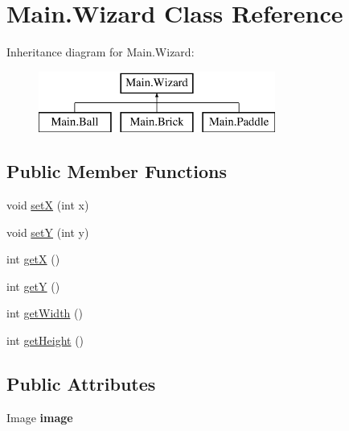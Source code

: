 \hypertarget{class_main_1_1_wizard}{}\section{Main.\+Wizard Class Reference}
\label{class_main_1_1_wizard}
Inheritance diagram for Main.\+Wizard\+:\begin{figure}[H]
\begin{center}
\leavevmode
\includegraphics[height=2.000000cm]{class_main_1_1_wizard}
\end{center}
\end{figure}
\subsection*{Public Member Functions}
\begin{DoxyCompactItemize}
\item 
void \hyperlink{class_main_1_1_wizard_aa4b5c7faf39649ed8fb1fb33cc3788e6}{setX} (int x)
\item 
void \hyperlink{class_main_1_1_wizard_a4c5d8c80ab66a0d2fa140ac5052f2d02}{setY} (int y)
\item 
int \hyperlink{class_main_1_1_wizard_af96f444dd5a2c9c62dfd8fdcbfd879f0}{getX} ()
\item 
int \hyperlink{class_main_1_1_wizard_a718fbfb8924f38028d230fd094c3aaf4}{getY} ()
\item 
int \hyperlink{class_main_1_1_wizard_a0c586454e8d579cb317f180a98755add}{get\+Width} ()
\item 
int \hyperlink{class_main_1_1_wizard_a88842db1cff1b208b0451456fbfa3593}{get\+Height} ()
\end{DoxyCompactItemize}
\subsection*{Public Attributes}
\begin{DoxyCompactItemize}
\item 
Image {\bfseries image}\hypertarget{class_main_1_1_wizard_a7abcdd7a22fc8f92f69cfa19700aa6cd}{}\label{class_main_1_1_wizard_a7abcdd7a22fc8f92f69cfa19700aa6cd}

\end{DoxyCompactItemize}
